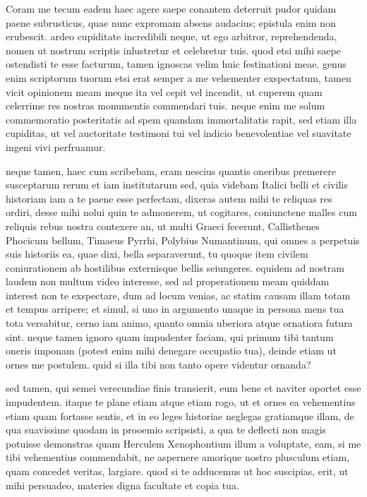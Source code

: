 


 Coram me tecum eadem haec agere saepe conantem deterruit pudor quidam paene subrusticus, quae nunc expromam absens audacius; epistula enim non erubescit. ardeo cupiditate incredibili neque, ut ego arbitror, reprehendenda, nomen ut nostrum scriptis inlustretur et celebretur tuis. quod etsi mihi saepe ostendisti te esse facturum, tamen ignoscas velim huic festinationi meae. genus enim scriptorum tuorum etsi erat semper a me vehementer exspectatum, tamen vicit opinionem meam meque ita vel cepit vel incendit, ut cuperem quam celerrime res nostras monumentis commendari tuis. neque enim me solum commemoratio posteritatis ad spem quandam immortalitatis rapit, sed etiam illa cupiditas, ut vel auctoritate testimoni tui vel indicio benevolentiae vel suavitate ingeni vivi perfruamur.

 neque tamen, haec cum scribebam, eram nescius quantis oneribus premerere susceptarum rerum et iam institutarum sed, quia videbam Italici belli et civilis historiam iam a te paene esse perfectam, dixeras autem mihi te reliquas res ordiri, desse mihi nolui quin te admonerem, ut cogitares, coniunctene malles cum reliquis rebus nostra contexere an, ut multi Graeci fecerunt, Callisthenes Phocicum bellum, Timaeus Pyrrhi, Polybius Numantinum, qui omnes a perpetuis suis historiis ea, quae dixi, bella separaverunt, tu quoque item civilem coniurationem ab hostilibus externisque bellis seiungeres. equidem ad nostram laudem non multum video interesse, sed ad properationem meam quiddam interest non te exspectare, dum ad locum venias, ac statim causam illam totam et tempus arripere; et simul, si uno in argumento unaque in persona mens tua tota versabitur, cerno iam animo, quanto omnia uberiora atque ornatiora futura sint. neque tamen ignoro quam impudenter faciam, qui primum tibi tantum oneris imponam (potest enim mihi denegare occupatio tua), deinde etiam ut ornes me postulem. quid si illa tibi non tanto opere videntur ornanda?

 sed tamen, qui semei verecundiae finis transierit, eum bene et naviter oportet esse impudentem. itaque te plane etiam atque etiam rogo, ut et ornes ea vehementius etiam quam fortasse sentis, et in eo leges historiae neglegas gratiamque illam, de qua suavissime quodam in prooemio scripsisti, a qua te deflecti non magis potuisse demonstras quam Herculem Xenophontium illum a voluptate, eam, si me tibi vehementius commendabit, ne aspernere amorique nostro plusculum etiam, quam concedet veritas, largiare. quod si te adducemus ut hoc suscipias, erit, ut mihi persuadeo, materies digna facultate et copia tua.


